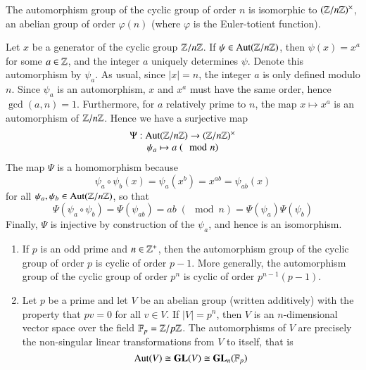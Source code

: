 \documentclass[12pt, a4paper, twoside, openright, titlepage]{book}
\begin{document}
\begin{prop}{}{}
    The automorphism group of the cyclic group of order $n$ is isomorphic to $(\mathbb Z/n\mathbb Z)^{\times}$, an abelian group of order $\varphi(n)$ (where $\varphi$ is the Euler-totient function).
\end{prop}
\begin{proof*}{}{}
    Let $x$ be a generator of the cyclic group $\mathbb Z/n\mathbb Z$. If $\psi \in \operatorname{Aut}(\mathbb Z/n\mathbb Z)$, then $\psi(x) = x^a$ for some $a \in \mathbb Z$, and the integer $a$ uniquely determines $\psi$. Denote this automorphism by $\psi_a$. As usual, since $|x| = n$, the integer $a$ is only defined modulo $n$. Since $\psi_a$ is an automorphism, $x$ and $x^a$ must have the same order, hence $\gcd(a,n) = 1$. Furthermore, for $a$ relatively prime to $n$, the map $x\mapsto x^a$ is an automorphism of $\mathbb Z/n\mathbb Z$. Hence we have a surjective map \begin{equation*}
        \begin{array}{c} \Psi:\operatorname{Aut}(\mathbb Z/n\mathbb Z)\rightarrow (\mathbb Z/n\mathbb Z)^{\times} \\ \psi_a\mapsto a\; (\mod n) \end{array}
    \end{equation*}
    The map $\Psi$ is a homomorphism because \begin{equation*}
        \psi_a\circ\psi_b(x) = \psi_a(x^b) = x^{ab} = \psi_{ab}(x)
    \end{equation*}
    for all $\psi_a,\psi_b \in \operatorname{Aut}(\mathbb Z/n\mathbb Z)$, so that \begin{equation*}
        \Psi(\psi_a\circ\psi_b) = \Psi(\psi_{ab}) = ab\;(\mod n) = \Psi(\psi_a)\Psi(\psi_b)
    \end{equation*}
    Finally, $\Psi$ is injective by construction of the $\psi_a$, and hence is an isomorphism.
\end{proof*}


\begin{eg}{}{}
    \leavevmode
    \begin{enumerate}
        \item If $p$ is an odd prime and $n \in \mathbb Z^+$, then the automorphism group of the cyclic group of order $p$ is cyclic of order $p-1$. More generally, the automorphism group of the cyclic group of order $p^n$ is cyclic of order $p^{n-1}(p-1)$.
        \item Let $p$ be a prime and let $V$ be an abelian group (written additively) with the property that $pv =0$ for all $v \in V$. If $|V| = p^n$, then $V$ is an $n$-dimensional vector space over the field $\mathbb F_p = \mathbb Z/p\mathbb Z$. The automorphisms of $V$ are precisely the non-singular linear transformations from $V$ to itself, that is \begin{equation*}
                \operatorname{Aut}(V) \cong \mathbf{GL}(V) \cong \mathbf{GL}_n(\mathbb F_p)
        \end{equation*}
    \end{enumerate}
\end{eg}
\end{document}
